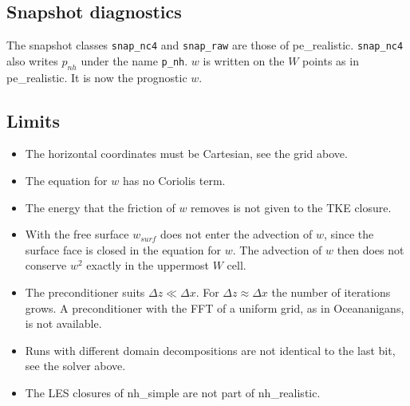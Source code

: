 \documentclass[12pt]{article}
\begin{document}
\subsection*{Snapshot diagnostics}

The snapshot classes \verb|snap_nc4| and \verb|snap_raw| are those of pe\_realistic.
\verb|snap_nc4| also writes $p_{nh}$ under the name \verb|p_nh|.
$w$ is written on the $W$ points as in pe\_realistic.
It is now the prognostic $w$.

\subsection*{Limits}

\begin{itemize}
\item The horizontal coordinates must be Cartesian, see the grid above.
\item The equation for $w$ has no Coriolis term.
\item The energy that the friction of $w$ removes is not given to the TKE closure.
\item With the free surface $w_{surf}$ does not enter the advection of $w$, since the surface face is closed in the equation for $w$. The advection of $w$ then does not conserve $w^2$ exactly in the uppermost $W$ cell.
\item The preconditioner suits $\Delta z \ll \Delta x$. For $\Delta z \approx \Delta x$ the number of iterations grows. A preconditioner with the FFT of a uniform grid, as in Oceananigans, is not available.
\item Runs with different domain decompositions are not identical to the last bit, see the solver above.
\item The LES closures of nh\_simple are not part of nh\_realistic.
\end{itemize}
\end{document}
